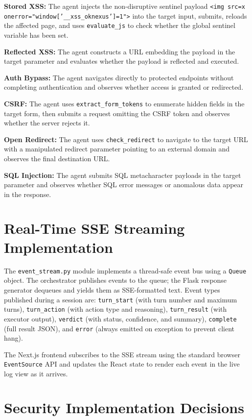 \textbf{Stored XSS:} The agent injects the non-disruptive sentinel payload \texttt{<img src=x onerror="window['\_\_xss\_oknexus']=1">} into the target input, submits, reloads the affected page, and uses \texttt{evaluate\_js} to check whether the global sentinel variable has been set.

\textbf{Reflected XSS:} The agent constructs a URL embedding the payload in the target parameter and evaluates whether the payload is reflected and executed.

\textbf{Auth Bypass:} The agent navigates directly to protected endpoints without completing authentication and observes whether access is granted or redirected.

\textbf{CSRF:} The agent uses \texttt{extract\_form\_tokens} to enumerate hidden fields in the target form, then submits a request omitting the CSRF token and observes whether the server rejects it.

\textbf{Open Redirect:} The agent uses \texttt{check\_redirect} to navigate to the target URL with a manipulated redirect parameter pointing to an external domain and observes the final destination URL.

\textbf{SQL Injection:} The agent submits SQL metacharacter payloads in the target parameter and observes whether SQL error messages or anomalous data appear in the response.

\section{Real-Time SSE Streaming Implementation}

The \texttt{event\_stream.py} module implements a thread-safe event bus using a \texttt{Queue} object. The orchestrator publishes events to the queue; the Flask response generator dequeues and yields them as SSE-formatted text. Event types published during a session are: \texttt{turn\_start} (with turn number and maximum turns), \texttt{turn\_action} (with action type and reasoning), \texttt{turn\_result} (with executor output), \texttt{verdict} (with status, confidence, and summary), \texttt{complete} (full result JSON), and \texttt{error} (always emitted on exception to prevent client hang).

The Next.js frontend subscribes to the SSE stream using the standard browser \texttt{EventSource} API and updates the React state to render each event in the live log view as it arrives.

\section{Security Implementation Decisions}


